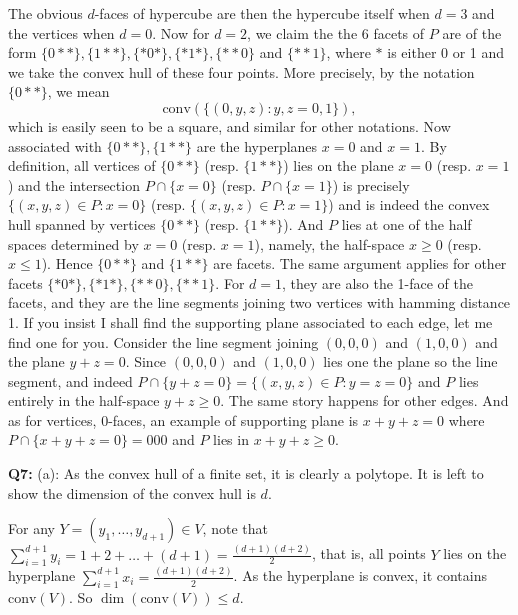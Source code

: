 \documentclass[12pt,reqno]{amsart}
\theoremstyle{definition}
\newcommand{\conv}[1]{\mathrm{conv}(#1)}
\begin{document}
The obvious $d$-faces of hypercube are then the hypercube itself when $d=3$ and the vertices when $d=0$. Now for $d=2$, we claim the the 6 facets of $P$ are of the form $\{0**\}, \{1**\}, \{*0*\},\{*1*\}, \{**0\}$ and $\{**1\}$, where $*$ is either 0 or 1 and we take the convex hull of these four points. More precisely, by the notation $\{0**\}$, we mean $$\conv{\{(0,y,z): y,z=0,1\}},$$ which is easily seen to be a square, and similar for other notations. Now associated with $\{0**\}, \{1**\}$ are the hyperplanes $x=0$ and $x=1$. By definition, all vertices of $\{0**\}$ (resp.  $\{1**\}$) lies on the plane $x=0$ (resp. $x=1$) and the intersection $P\cap\{x=0\}$ (resp. $P\cap \{x=1\}$) is precisely $\{(x,y,z)\in P: x=0\}$ (resp. $\{(x,y,z)\in P: x=1\}$) and is indeed the convex hull spanned by vertices $\{0**\}$ (resp. $\{1**\}$). And $P$ lies at one of the half spaces determined by $x=0$ (resp. $x=1$), namely, the half-space $x\geq 0$ (resp. $x\leq 1$). Hence $\{0**\}$  and $\{1**\}$  are facets. The same argument applies for other facets $\{*0*\},\{*1*\}, \{**0\}, \{**1\}$. For $d=1$, they are also the 1-face of the facets, and they are the line segments joining two vertices with hamming distance 1. If you insist I shall find the supporting plane associated to each edge, let me find one for you. Consider the line segment joining $(0,0,0)$ and $(1,0,0)$ and the plane $y+z=0$. Since $(0,0,0)$ and $(1,0,0)$ lies one the plane so the line segment, and indeed $P\cap \{y+z=0\}=\{(x,y,z)\in P: y=z=0\}$ and $P$ lies entirely in the half-space $y+z\geq 0$. The same story happens for other edges. And as for vertices, 0-faces, an example of supporting plane is $x+y+z=0$ where $P\cap \{x+y+z=0\}=000$ and $P$ lies in $x+y+z\geq 0$.




\newpage
\noindent \textbf{Q7:} (a): As the convex hull of a finite set, it is clearly a polytope. It is left to show the dimension of the convex hull is $d$.


For any $Y=(y_1,\dots,y_{d+1})\in V$, note that $\sum_{i=1}^{d+1} y_i = 1+2+\dots +(d+1) = \frac{(d+1)(d+2)}{2}$, that is, all points $Y$ lies on the hyperplane $\sum_{i=1}^{d+1} x_i = \frac{(d+1)(d+2)}{2}$. As the hyperplane is convex, it contains $\conv{V}$. So $\dim(\conv{V})\leq d$.
\end{document}
